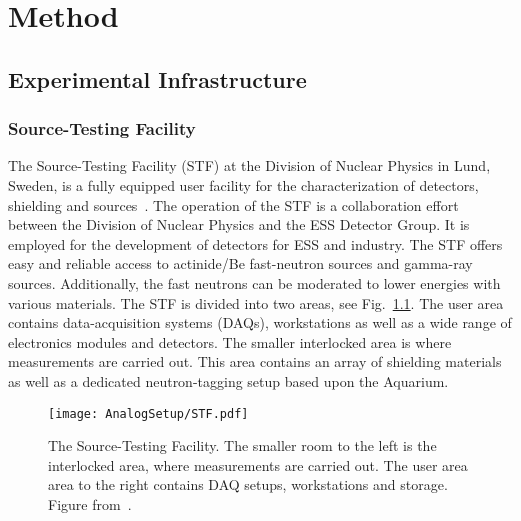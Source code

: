 \documentclass[main.tex]{subfiles}
\begin{document}
\chapter{Method}
\section{Experimental Infrastructure}
\subsection{Source-Testing Facility}
The Source-Testing Facility (STF) at the Division of Nuclear Physics in Lund, Sweden, is a fully equipped user facility for the characterization of detectors, shielding and sources~\cite{Messi}.
The operation of the STF is a collaboration effort between the Division of Nuclear Physics and the ESS Detector Group. It is employed for the development of detectors for ESS and industry. The STF offers easy and reliable access to actinide/Be fast-neutron sources and gamma-ray sources. Additionally, the fast neutrons can be moderated to lower energies with various materials. The STF is divided into two areas, see Fig.~\ref{fig:STF}. The user area contains data-acquisition systems (DAQs), workstations as well as a wide range of electronics modules and detectors. The smaller interlocked area is where measurements are carried out. This area contains an array of shielding materials as well as a dedicated neutron-tagging setup based upon the Aquarium.

\begin{figure}[ht]
	\center
    	\texttt{[image: AnalogSetup/STF.pdf]}
	\caption[The Source-Testing Facility.]{The Source-Testing Facility. The smaller room to the left is the interlocked area, where measurements are carried out. The user area area to the right contains DAQ setups, workstations and storage. Figure from~\cite{Messi}.}
	\label{fig:STF}
\end{figure}
\end{document}
